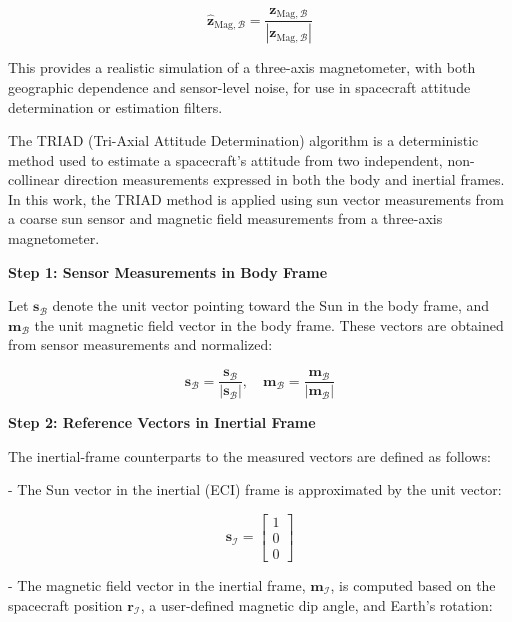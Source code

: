 \begin{equation}
    \hat{\mathbf{z}}_{\text{Mag},\mathcal{B}} = \frac{\mathbf{z}_{\text{Mag},\mathcal{B}}}{|\mathbf{z}_{\text{Mag},\mathcal{B}}|}
\end{equation}

This provides a realistic simulation of a three-axis magnetometer, with both geographic dependence and sensor-level noise, for use in spacecraft attitude determination or estimation filters.



The TRIAD (Tri-Axial Attitude Determination) algorithm is a deterministic method used to estimate a spacecraft's attitude from two independent, non-collinear direction measurements expressed in both the body and inertial frames. In this work, the TRIAD method is applied using sun vector measurements from a coarse sun sensor and magnetic field measurements from a three-axis magnetometer.

\textbf{Step 1: Sensor Measurements in Body Frame}

Let $\mathbf{s}_{\mathcal{B}}$ denote the unit vector pointing toward the Sun in the body frame, and $\mathbf{m}_{\mathcal{B}}$ the unit magnetic field vector in the body frame. These vectors are obtained from sensor measurements and normalized:

\begin{equation}
    \mathbf{s}_{\mathcal{B}} = \frac{\mathbf{s}_{\mathcal{B}}}{|\mathbf{s}_{\mathcal{B}}|}, \quad
    \mathbf{m}_{\mathcal{B}} = \frac{\mathbf{m}_{\mathcal{B}}}{|\mathbf{m}_{\mathcal{B}}|}
\end{equation}

\textbf{Step 2: Reference Vectors in Inertial Frame}

The inertial-frame counterparts to the measured vectors are defined as follows:

- The Sun vector in the inertial (ECI) frame is approximated by the unit vector:

\begin{equation}
   \mathbf{s}_{\mathcal{I}} = \begin{bmatrix} 1 \\ 0 \\ 0 \end{bmatrix}
\end{equation}

- The magnetic field vector in the inertial frame, $\mathbf{m}_{\mathcal{I}}$, is computed based on the spacecraft position $\mathbf{r}_{\mathcal{I}}$, a user-defined magnetic dip angle, and Earth’s rotation:

